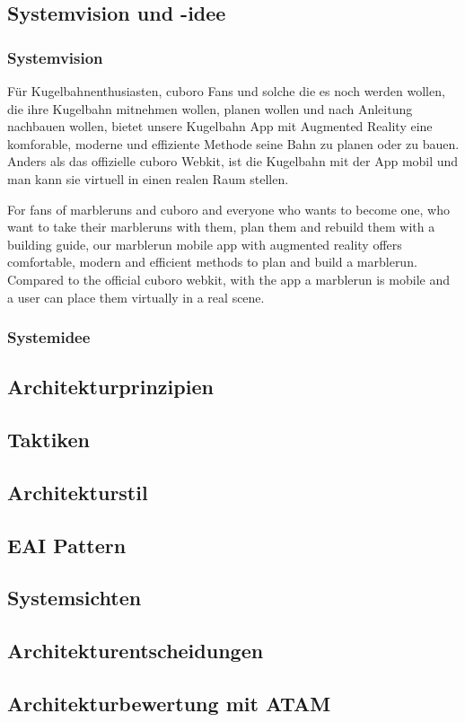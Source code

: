 \subsection{Systemvision und -idee}
\subsubsection{Systemvision}

Für Kugelbahnenthusiasten, cuboro Fans und solche die es noch werden wollen,
die ihre Kugelbahn mitnehmen wollen, planen wollen und nach Anleitung nachbauen wollen,
bietet unsere Kugelbahn App
mit Augmented Reality
eine komforable, moderne und effiziente Methode seine Bahn zu planen oder zu bauen.
Anders als das offizielle cuboro Webkit,
ist die Kugelbahn mit der App mobil und man kann sie virtuell in einen realen Raum stellen.

For fans of marbleruns and cuboro and everyone who wants to become one,
who want to take their marbleruns with them, plan them and rebuild them with a building guide,
our marblerun mobile app
with augmented reality
offers comfortable, modern and efficient methods to plan and build a marblerun.
Compared to the official cuboro webkit,
with the app a marblerun is mobile and a user can place them virtually in a real scene.

\subsubsection{Systemidee}
\subsection{Architekturprinzipien}
\subsection{Taktiken}
\subsection{Architekturstil}
\subsection{EAI Pattern}
\subsection{Systemsichten}
\subsection{Architekturentscheidungen}
\subsection{Architekturbewertung mit ATAM}
